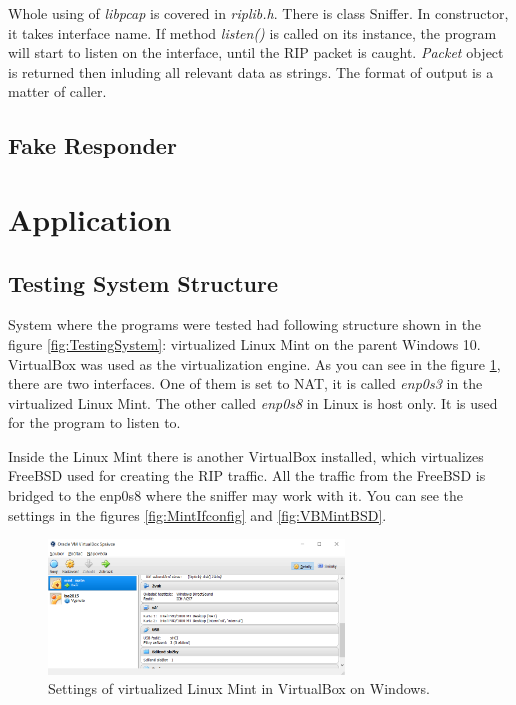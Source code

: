 \documentclass[10pt,a4paper,titlepage]{article}
\begin{document}
            Whole using of {\it libpcap} is covered in {\it riplib.h}. There is class Sniffer. In constructor, it takes interface
            name. If method {\it listen()} is called on its instance, the program will start to listen on the interface, until
            the RIP packet is caught. {\it Packet} object is returned then inluding all relevant data as strings. The format
            of output is a matter of caller.
            
        \subsection{Fake Responder}
        

    
    \newpage
    \section{Application}
        
        \subsection{Testing System Structure}
            System where the programs were tested had following structure shown in the figure \ref{fig:TestingSystem}: virtualized Linux Mint
            on the parent Windows 10. VirtualBox was used as the virtualization engine. As you can see in the figure \ref{fig:VBWinMint},
            there are two interfaces. One of them is set to NAT, it is called {\it enp0s3} in the virtualized Linux Mint. The other called
            {\it enp0s8} in Linux is host only. It is used for the program to listen to.

            Inside the Linux Mint there is another VirtualBox installed, which virtualizes FreeBSD used for creating the RIP traffic.
            All the traffic from the FreeBSD is bridged to the enp0s8 where the sniffer may work with it. You can see the settings
            in the figures \ref{fig:MintIfconfig} and \ref{fig:VBMintBSD}.

            \begin{figure}[h!]
                \begin{center}
                    \includegraphics[width=0.70\textwidth]{winmint.png}
                    \caption{Settings of virtualized Linux Mint in VirtualBox on Windows. \label{fig:VBWinMint}}
                \end{center}
            \end{figure}
\end{document}
